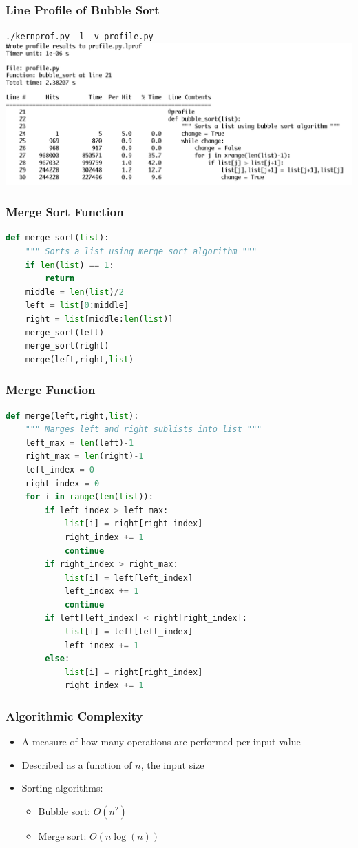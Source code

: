 \documentclass[xcolor=table,10pt,final]{beamer}
\begin{document}
\begin{frame}[fragile]
	\frametitle{Line Profile of Bubble Sort}
	{\tt ./kernprof.py -l -v profile.py} \newline \newline
	\centering \includegraphics[scale=0.3]{profile}	
\end{frame}

\begin{frame}[fragile]
	\frametitle{Merge Sort Function}
	\begin{lstlisting}[language=Python]
def merge_sort(list):
    """ Sorts a list using merge sort algorithm """
    if len(list) == 1:
        return
    middle = len(list)/2
    left = list[0:middle]
    right = list[middle:len(list)]
    merge_sort(left)
    merge_sort(right)
    merge(left,right,list)
	\end{lstlisting}
\end{frame}

\begin{frame}[fragile]
	\frametitle{Merge Function}
	\begin{lstlisting}[language=Python]
def merge(left,right,list):
    """ Marges left and right sublists into list """
    left_max = len(left)-1
    right_max = len(right)-1
    left_index = 0
    right_index = 0
    for i in range(len(list)):
        if left_index > left_max:
            list[i] = right[right_index]
            right_index += 1
            continue
        if right_index > right_max:
            list[i] = left[left_index]
            left_index += 1
            continue
        if left[left_index] < right[right_index]:
            list[i] = left[left_index]
            left_index += 1
        else:
            list[i] = right[right_index]
            right_index += 1
	\end{lstlisting}
\end{frame}

\begin{frame}
	\frametitle{Algorithmic Complexity}
	\begin{itemize}
		\item A measure of how many operations are performed per input value
		\item Described as a function of $n$, the input size
		\item Sorting algorithms:
		\begin{itemize}
			\item Bubble sort: $O(n^2)$
			\item Merge sort: $O(n\log(n))$
		\end{itemize}
	\end{itemize}
\end{frame}
\end{document}
